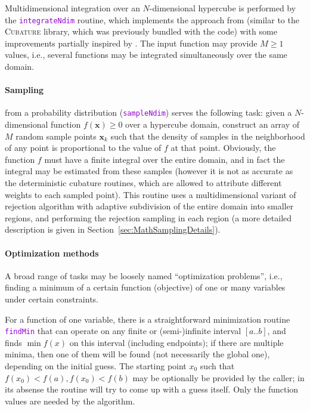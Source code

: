 \documentclass[12pt]{article}
\newcommand{\ttt}[1]{\textcolor{darkviolet}{\texttt{#1}}}
\newcommand{\bx}{\boldsymbol{x}}
\let\oldparagraph\paragraph
\renewcommand{\paragraph}[1]{\vspace{-2mm}\oldparagraph{#1}}
\begin{document}
Multidimensional integration over an $N$-dimensional hypercube is performed by the \ttt{integrateNdim} routine, which implements the approach from \cite{GenzMalik1980} (similar to the \textsc{Cubature} library, which was previously bundled with the code) with some improvements partially inspired by \cite{Berntsen1991}. The input function may provide $M\ge 1$ values, i.e., several functions may be integrated simultaneously over the same domain.

\paragraph{Sampling} \label{sec:Sampling}  from a probability distribution (\ttt{sampleNdim}) serves the following task: given a $N$-dimensional function $f(\bx)\ge 0$ over a hypercube domain, construct an array of $M$ random sample points $\bx_k$ such that the density of samples in the neighborhood of any point is proportional to the value of $f$ at that point. Obviously, the function $f$ must have a finite integral over the entire domain, and in fact the integral may be estimated from these samples (however it is not as accurate as the deterministic cubature routines, which are allowed to attribute different weights to each sampled point). This routine uses a multidimensional variant of rejection algorithm with adaptive subdivision of the entire domain into smaller regions, and performing the rejection sampling in each region (a more detailed description is given in Section~\ref{sec:MathSamplingDetails}).

\paragraph{Optimization methods}
A broad range of tasks may be loosely named ``optimization problems'', i.e., finding a minimum of a certain function (objective) of one or many variables under certain constraints.

For a function of one variable, there is a straightforward minimization routine \ttt{findMin} that can operate on any finite or (semi-)infinite interval $[a..b]$, and finds $\min f(x)$ on this interval (including endpoints); if there are multiple minima, then one of them will be found (not necessarily the global one), depending on the initial guess. The starting point $x_0$ such that  $f(x_0)<f(a), f(x_0)<f(b)$ may be optionally be provided by the caller; in its absense the routine will try to come up with a guess itself. Only the function values are needed by the algorithm.
\end{document}
